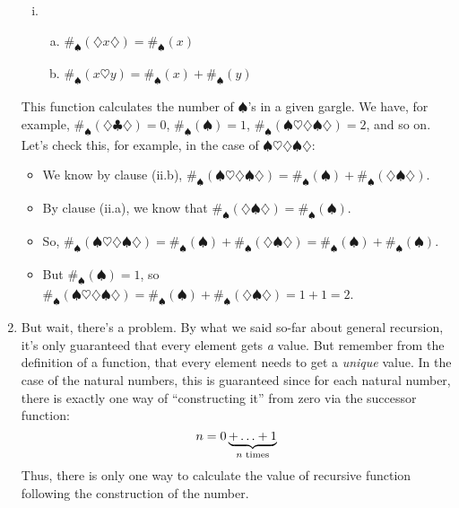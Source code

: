 \begin{enumerate}[{\thesection}.1]
\begin{enumerate}[(i)]
			\item \begin{enumerate}[(a)]
					
					\item  $\#_\spadesuit( \diamondsuit x\diamondsuit)=\#_\spadesuit(x)$

					\item $\#_\spadesuit(x\heartsuit y)=\#_\spadesuit(x)+\#_\spadesuit(y)$		
		\end{enumerate}
		
		\end{enumerate}
		This function calculates the number of $\spadesuit$'s in a given gargle. We have, for example, $\#_\spadesuit(\diamondsuit\clubsuit\diamondsuit)=0$, $\#_\spadesuit(\spadesuit)=1$, $\#_\spadesuit(\spadesuit\heartsuit\diamondsuit\spadesuit\diamondsuit)=2$, and so on. Let's check this, for example, in the case of $\spadesuit\heartsuit\diamondsuit\spadesuit\diamondsuit$:
		
		\begin{itemize}
		
			\item We know by clause (ii.b), $\#_\spadesuit(\spadesuit\heartsuit\diamondsuit\spadesuit\diamondsuit)=\#_\spadesuit(\spadesuit)+\#_\spadesuit(\diamondsuit\spadesuit\diamondsuit)$.
			
			\item By clause (ii.a), we know that $\#_\spadesuit(\diamondsuit\spadesuit\diamondsuit)=\#_\spadesuit(\spadesuit)$.
			
			\item So, $\#_\spadesuit(\spadesuit\heartsuit\diamondsuit\spadesuit\diamondsuit)=\#_\spadesuit(\spadesuit)+\#_\spadesuit(\diamondsuit\spadesuit\diamondsuit)=\#_\spadesuit(\spadesuit)+\#_\spadesuit(\spadesuit)$.
			
			\item But $\#_\spadesuit(\spadesuit)=1$, so $\#_\spadesuit(\spadesuit\heartsuit\diamondsuit\spadesuit\diamondsuit)=\#_\spadesuit(\spadesuit)+\#_\spadesuit(\diamondsuit\spadesuit\diamondsuit)=1+1=2$.
		
		\end{itemize}
		
		\item But wait, there's a problem. By what we said so-far about general recursion, it's only guaranteed that every element gets \emph{a} value. But remember from the definition of a function, that every element needs to get a \emph{unique} value. In the case of the natural numbers, this is guaranteed since for each natural number, there is exactly one way of ``constructing it'' from zero via the successor function: \[n=0\underbrace{+\mathellipsis+1}_{n\text{ times}}\] Thus, there is only one way to calculate the value of recursive function following the construction of the number.
		

\end{enumerate}
